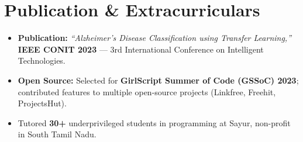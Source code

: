 \documentclass[letterpaper,10pt]{article}
\begin{document}
\section{Publication \& Extracurriculars}
\begin{itemize}[leftmargin=0.18in, itemsep=0pt, topsep=1pt]
  \item\small \textbf{Publication:} \textit{``Alzheimer's Disease Classification using Transfer Learning,''} \textbf{IEEE CONIT 2023} --- 3rd International Conference on Intelligent Technologies.
  \item\small \textbf{Open Source:} Selected for \textbf{GirlScript Summer of Code (GSSoC) 2023}; contributed features to multiple open-source projects (Linkfree, Freehit, ProjectsHut).
  \item\small Tutored \textbf{30+} underprivileged students in programming at Sayur, non-profit in South Tamil Nadu.
\end{itemize}
\vspace{-6pt}
\end{document}
